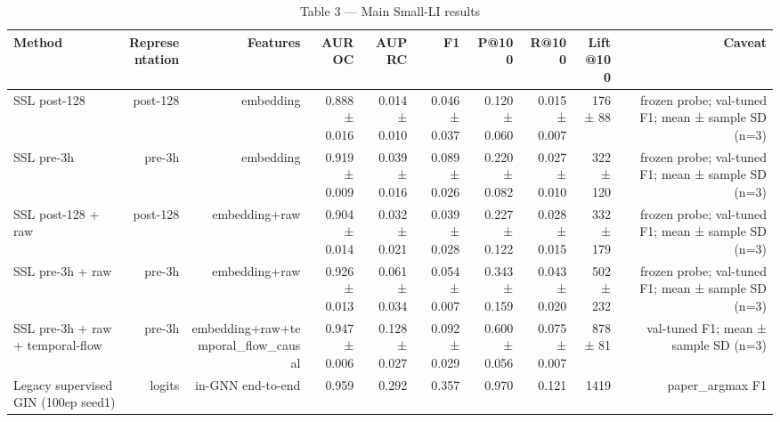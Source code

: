 \begin{table}[t]
\centering
\caption{Table 3 — Main Small-LI results}
\begin{tabular}{lrrrrrrrrr}
\toprule
Method & Representation & Features & AUROC & AUPRC & F1 & P@100 & R@100 & Lift@100 & Caveat \\
\midrule
SSL post-128 & post-128 & embedding & 0.888 ± 0.016 & 0.014 ± 0.010 & 0.046 ± 0.037 & 0.120 ± 0.060 & 0.015 ± 0.007 & 176 ± 88 & frozen probe; val-tuned F1; mean ± sample SD (n=3) \\
SSL pre-3h & pre-3h & embedding & 0.919 ± 0.009 & 0.039 ± 0.016 & 0.089 ± 0.026 & 0.220 ± 0.082 & 0.027 ± 0.010 & 322 ± 120 & frozen probe; val-tuned F1; mean ± sample SD (n=3) \\
SSL post-128 + raw & post-128 & embedding+raw & 0.904 ± 0.014 & 0.032 ± 0.021 & 0.039 ± 0.028 & 0.227 ± 0.122 & 0.028 ± 0.015 & 332 ± 179 & frozen probe; val-tuned F1; mean ± sample SD (n=3) \\
SSL pre-3h + raw & pre-3h & embedding+raw & 0.926 ± 0.013 & 0.061 ± 0.034 & 0.054 ± 0.007 & 0.343 ± 0.159 & 0.043 ± 0.020 & 502 ± 232 & frozen probe; val-tuned F1; mean ± sample SD (n=3) \\
SSL pre-3h + raw + temporal-flow & pre-3h & embedding+raw+temporal\_flow\_causal & 0.947 ± 0.006 & 0.128 ± 0.027 & 0.092 ± 0.029 & 0.600 ± 0.056 & 0.075 ± 0.007 & 878 ± 81 & val-tuned F1; mean ± sample SD (n=3) \\
Legacy supervised GIN (100ep seed1) & logits & in-GNN end-to-end & 0.959 & 0.292 & 0.357 & 0.970 & 0.121 & 1419 & paper\_argmax F1 \\
\bottomrule
\end{tabular}
\end{table}
